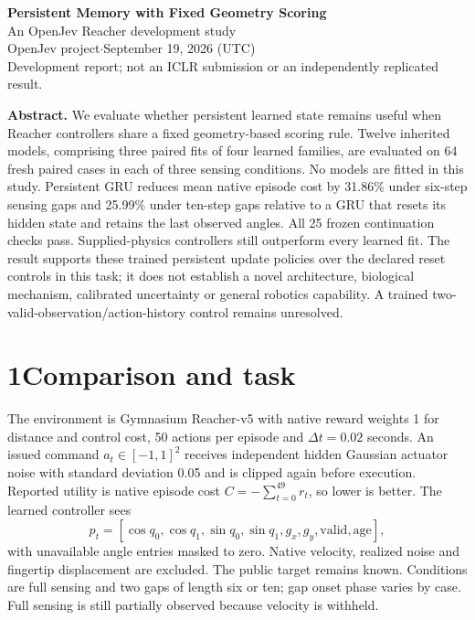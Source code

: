 \documentclass[10pt,letterpaper]{article}
\begin{document}
\begin{center}
{\LARGE\bfseries Persistent Memory with Fixed Geometry Scoring}\\[5pt]
{\large An OpenJev Reacher development study}\\[5pt]
OpenJev project\quad $\cdot$\quad September 19, 2026 (UTC)\\[3pt]
{\small Development report; not an ICLR submission or an independently replicated result.}
\end{center}

\textbf{Abstract.} We evaluate whether persistent learned state remains useful when
Reacher controllers share a fixed geometry-based scoring rule. Twelve inherited
models, comprising three paired fits of four learned families, are evaluated on
64 fresh paired cases in each of three sensing conditions. No models are fitted
in this study. Persistent GRU reduces mean native episode cost by 31.86\% under
six-step sensing gaps and 25.99\% under ten-step gaps relative to a GRU that
resets its hidden state and retains the last observed angles. All 25 frozen
continuation checks pass. Supplied-physics controllers still outperform every
learned fit. The result supports these trained persistent update policies over
the declared reset controls in this task; it does not establish a novel
architecture, biological mechanism, calibrated uncertainty or general robotics
capability. A trained two-valid-observation/action-history control remains unresolved.

\section*{1\quad Comparison and task}
The environment is Gymnasium Reacher-v5 with native reward weights 1 for
distance and control cost, 50 actions per episode and $\Delta t=0.02$ seconds.
An issued command $a_t\in[-1,1]^2$ receives independent hidden Gaussian actuator
noise with standard deviation 0.05 and is clipped again before execution.
Reported utility is native episode cost $C=-\sum_{t=0}^{49}r_t$, so lower is better.
The learned controller sees
\[
 p_t=[\cos q_0,\cos q_1,\sin q_0,\sin q_1,g_x,g_y,\mathrm{valid},\mathrm{age}],
\]
with unavailable angle entries masked to zero. Native velocity, realized noise
and fingertip displacement are excluded. The public target remains known.
Conditions are full sensing and two gaps of length six or ten; gap onset phase
varies by case. Full sensing is still partially observed because velocity is withheld.
\end{document}
